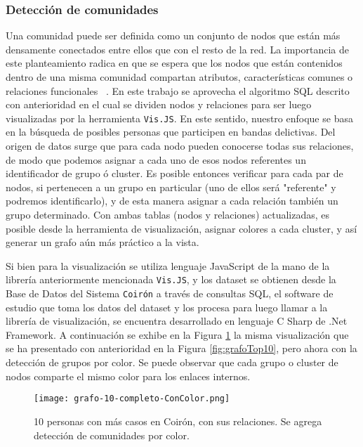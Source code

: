 \vspace{-25pt}
\subsubsection{Detección de comunidades}
Una comunidad puede ser definida como un conjunto de nodos que están más densamente conectados entre ellos que con el resto de la red. La importancia de este planteamiento radica en que se espera que los nodos que están contenidos dentro de una misma comunidad compartan atributos, características comunes o relaciones funcionales  ~\cite{ma2014exploring}.
En este trabajo se aprovecha el algoritmo SQL descrito con anterioridad en el cual se dividen nodos y relaciones para ser luego visualizadas por la herramienta \texttt{Vis.JS}.
En este sentido, nuestro enfoque se basa en la búsqueda de posibles personas que participen en bandas delictivas. Del origen de datos surge que para cada nodo pueden conocerse todas sus relaciones, de modo que podemos asignar a cada uno de esos nodos referentes un identificador de grupo ó cluster. 
Es posible entonces verificar para cada par de nodos, si pertenecen a un grupo en particular (uno de ellos será "referente" y podremos identificarlo), y de esta manera asignar a cada relación también un grupo determinado. Con ambas tablas (nodos y relaciones) actualizadas, es posible desde la herramienta de visualización, asignar colores a cada cluster, y así generar un grafo aún más práctico a la vista.

Si bien para la visualización se utiliza lenguaje JavaScript de la mano de la librería anteriormente mencionada \texttt{Vis.JS}, y los dataset se obtienen desde la Base de Datos del Sistema \texttt{Coirón} a través de consultas SQL, el software de estudio que toma los datos del dataset y los procesa para luego llamar a la librería de visualización, se encuentra desarrollado en lenguaje C Sharp de .Net Framework. 
A continuación se exhibe en la Figura \ref{fig:grafo-10-completo-ConColor} la misma visualización que se ha presentado con anterioridad en la Figura \ref{fig:grafoTop10}, pero ahora con la detección de grupos por color. Se puede observar que cada grupo o cluster de nodos comparte el mismo color para los enlaces internos. 
\vspace{-10pt}
\begin{figure}
	\centering
	\texttt{[image: grafo-10-completo-ConColor.png]}
	\caption{10 personas con más casos en Coirón, con sus relaciones. Se agrega detección de comunidades por color.} 
	\label{fig:grafo-10-completo-ConColor}
\end{figure}
\vspace{-30pt}